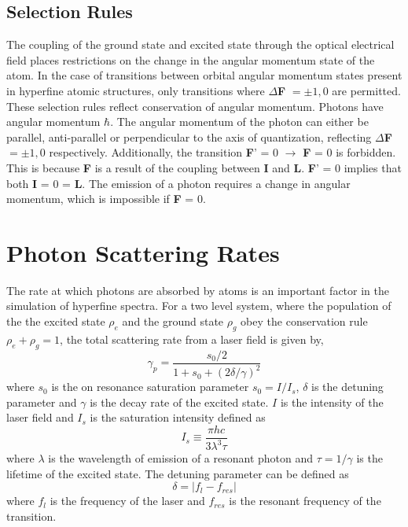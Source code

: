 \documentclass[12pt,a4paper,margin=1in]{report}
\begin{document}
\subsection{Selection Rules}
The coupling of the ground state and excited state through the optical electrical field places restrictions on the change in the angular momentum state of the atom. In the case of transitions between orbital angular momentum states present in hyperfine atomic structures, only transitions where $\Delta$\textbf{F}  $=\pm1,0$ are permitted. These selection rules reflect conservation of angular momentum. Photons have angular momentum $\hbar$. The angular momentum of the photon can either be parallel, anti-parallel or perpendicular to the axis of quantization, reflecting $\Delta$\textbf{F}$=\pm1,0$ respectively. Additionally, the transition \textbf{F}' = 0 $\rightarrow$ \textbf{F} = 0 is forbidden. This is because \textbf{F} is a result of the coupling between \textbf{I} and \textbf{L}. \textbf{F}' = 0 implies that both \textbf{I} = 0 = \textbf{L}. The emission of a photon requires a change in angular momentum, which is impossible if \textbf{F} = 0.

\section{Photon Scattering Rates}
The rate at which photons are absorbed by atoms is an important factor in the simulation of hyperfine spectra. For a two level system, where the population of the the excited state $\rho_{e}$ and the ground state $\rho_{g}$ obey the conservation rule $\rho_e +\rho_g = 1$, the total scattering rate from a laser field is given by,
\begin{equation}
\gamma_p =  \frac{s_0/2}{1+s_0+(2\delta/\gamma)^2}
\end{equation}
where $s_0$ is the on resonance saturation parameter $s_0 = I/I_s$, $\delta$ is the detuning parameter and $\gamma$ is the decay rate of the excited state. $I$ is the intensity of the laser field and $I_s$ is the saturation intensity defined as
\begin{equation}
I_s \equiv \frac{\pi h c}{3 \lambda^3 \tau}
\end{equation}
where $\lambda$ is the wavelength of emission of a resonant photon and $\tau = 1/\gamma$ is the lifetime of the excited state. The detuning parameter can be defined as
\begin{equation}
\delta =|f_{l} - f_{res}|
\end{equation}
where $f_l$ is the frequency of the laser and $f_{res}$ is the resonant frequency of the transition.


{}
\end{document}
